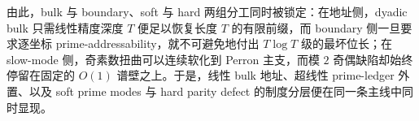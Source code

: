 \noindent
由此，bulk 与 boundary、soft 与 hard 两组分工同时被锁定：在地址侧，dyadic bulk 只需线性精度深度 \(T\) 便足以恢复长度 \(T\) 的有限前缀，而 boundary 侧一旦要求逐坐标 prime-addressability，就不可避免地付出 \(T\log T\) 级的最坏位长；在 slow-mode 侧，奇素数扭曲可以连续软化到 Perron 主支，而模 \(2\) 奇偶缺陷却始终停留在固定的 \(O(1)\) 谱壁之上。于是，线性 bulk 地址、超线性 prime-ledger 外置、以及 soft prime modes 与 hard parity defect 的制度分层便在同一条主线中同时显现。

\endinput
